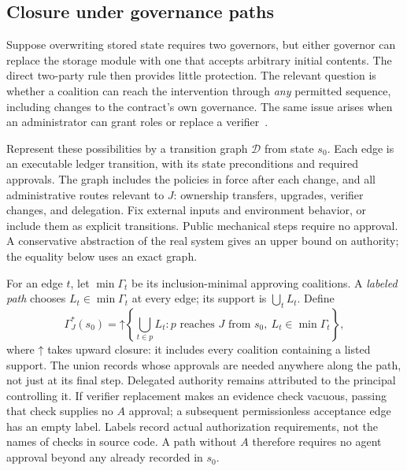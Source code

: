 \documentclass[10pt,letterpaper]{article}
\newcommand{\up}{\mathord\uparrow}
\begin{document}
\subsection{Closure under governance paths}
Suppose overwriting stored state requires two governors, but either governor can replace the storage module with one that accepts arbitrary initial contents. The direct two-party rule then provides little protection. The relevant question is whether a coalition can reach the intervention through \emph{any} permitted sequence, including changes to the contract's own governance. The same issue arises when an administrator can grant roles or replace a verifier~\citep{openzeppelinaccess}.

Represent these possibilities by a transition graph $\mathcal D$ from state $s_0$. Each edge is an executable ledger transition, with its state preconditions and required approvals. The graph includes the policies in force after each change, and all administrative routes relevant to $J$: ownership transfers, upgrades, verifier changes, and delegation. Fix external inputs and environment behavior, or include them as explicit transitions. Public mechanical steps require no approval. A conservative abstraction of the real system gives an upper bound on authority; the equality below uses an exact graph.

For an edge $t$, let $\min\Gamma_t$ be its inclusion-minimal approving coalitions. A \emph{labeled path} chooses $L_t\in\min\Gamma_t$ at every edge; its support is $\bigcup_t L_t$. Define
\begin{equation}
 \Gamma_J^*(s_0)=\up\left\{\bigcup_{t\in p}L_t:
 p\text{ reaches }J\text{ from }s_0,\ L_t\in\min\Gamma_t\right\},
 \label{eq:closure}
\end{equation}
where $\up$ takes upward closure: it includes every coalition containing a listed support. The union records whose approvals are needed anywhere along the path, not just at its final step. Delegated authority remains attributed to the principal controlling it. If verifier replacement makes an evidence check vacuous, passing that check supplies no $A$ approval; a subsequent permissionless acceptance edge has an empty label. Labels record actual authorization requirements, not the names of checks in source code. A path without $A$ therefore requires no agent approval beyond any already recorded in $s_0$.
\end{document}
